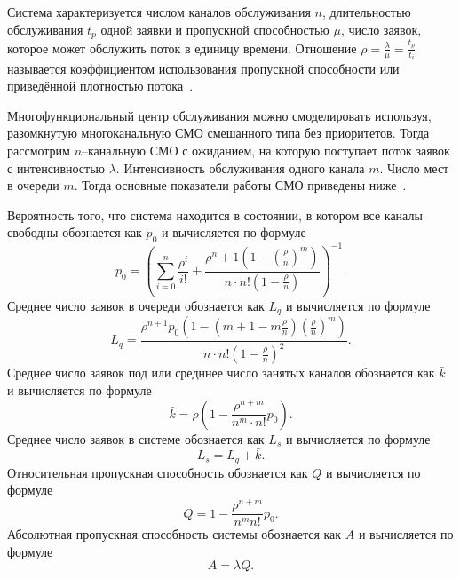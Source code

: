 Система характеризуется числом каналов обслуживания $n$, длительностью обслуживания $t_p$ одной заявки и пропускной способностью $\mu$, число заявок, которое может обслужить поток в единицу времени. Отношение $\rho = \frac{\lambda}{\mu} = \frac{t_p}{t_i}$ называется коэффициентом использования пропускной способности или приведённой плотностью потока~\cite{smo}.

Многофункциональный центр обслуживания можно смоделировать используя, разомкнутую многоканальную СМО смешанного типа без приоритетов. Тогда рассмотрим $n$--канальную СМО с ожиданием, на которую поступает поток заявок с интенсивностью $\lambda$. Интенсивность обслуживания одного канала $m$. Число мест в очереди $m$. Тогда основные показатели работы СМО приведены ниже~\cite{smo}.

Вероятность того, что система находится в состоянии, в котором все каналы свободны обознается как $p_0$ и вычисляется по формуле
\begin{equation}
	\label{eq:smo_po}
	p_0 = (\sum_{i=0}^{n}\frac{\rho^i}{i!} + \frac{\rho^n+1(1-(\frac{\rho}{n})^m)}{n \cdot n! (1 - \frac{\rho}{n})})^{-1}.
\end{equation}
Среднее число заявок в очереди обознается как $L_q$ и вычисляется по формуле
\begin{equation}
	\label{eq:smo_lq}
	L_q=\frac{\rho^{n+1} p_0\left(1-\left(m+1-m \frac{\rho}{n}\right)\left(\frac{\rho}{n}\right)^m\right)}{n \cdot n !\left(1-\frac{\rho}{n}\right)^2}.
\end{equation}
Среднее число заявок под или средннее число занятых каналов обознается как $\bar{k}$ и вычисляется по формуле
\begin{equation}
	\label{eq:smo_k}
	\bar{k}=\rho\left(1-\frac{\rho^{n+m}}{n^m \cdot n !} p_0\right).
\end{equation}
Среднее число заявок в системе обознается как $L_s$ и вычисляется по формуле
\begin{equation}
	\label{eq:smo_ls}
	L_s=L_q+\bar{k}.
\end{equation}
Относительная пропускная способность обознается как $Q$ и вычисляется по формуле
\begin{equation}
	\label{eq:smo_q}
	Q=1-\frac{\rho^{n+m}}{n^m n !} p_0.
\end{equation}
Абсолютная пропускная способность системы обознается как $A$ и вычисляется по формуле
\begin{equation}
	\label{eq:smo_a}
	A=\lambda Q.
\end{equation}


